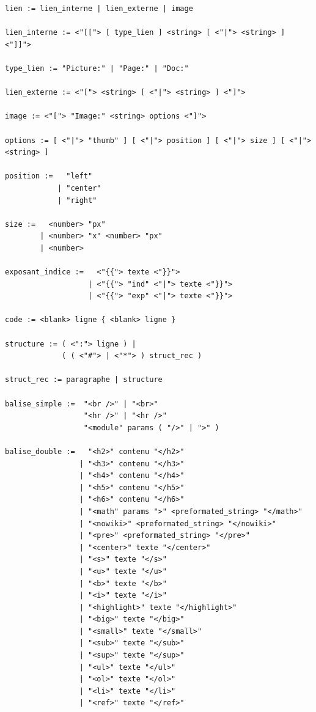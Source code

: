 \documentclass[final,11pt,a4paper,twoside,titlepage]{article}
\begin{document}
{\begin{verbatim}
lien := lien_interne | lien_externe | image
  
lien_interne := <"[["> [ type_lien ] <string> [ <"|"> <string> ] <"]]">
                                    
type_lien := "Picture:" | "Page:" | "Doc:"
  
lien_externe := <"["> <string> [ <"|"> <string> ] <"]">
  
image := <"["> "Image:" <string> options <"]">
                                 
options := [ <"|"> "thumb" ] [ <"|"> position ] [ <"|"> size ] [ <"|"> <string> ]
 
position :=   "left" 
            | "center" 
            | "right"
  
size :=   <number> "px" 
        | <number> "x" <number> "px"
        | <number>
          
exposant_indice :=   <"{{"> texte <"}}">
                   | <"{{"> "ind" <"|"> texte <"}}">
                   | <"{{"> "exp" <"|"> texte <"}}">
          
code := <blank> ligne { <blank> ligne }      
  
structure := ( <":"> ligne ) | 
             ( ( <"#"> | <"*"> ) struct_rec )
  
struct_rec := paragraphe | structure
  
balise_simple :=  "<br />" | "<br>"
                  "<hr />" | "<hr />"
                  "<module" params ( "/>" | ">" )                
  
balise_double :=   "<h2>" contenu "</h2>"
                 | "<h3>" contenu "</h3>"
                 | "<h4>" contenu "</h4>"
                 | "<h5>" contenu "</h5>"
                 | "<h6>" contenu "</h6>"
                 | "<math" params ">" <preformated_string> "</math>"
                 | "<nowiki>" <preformated_string> "</nowiki>"
                 | "<pre>" <preformated_string> "</pre>"
                 | "<center>" texte "</center>"                       
                 | "<s>" texte "</s>"
                 | "<u>" texte "</u>"
                 | "<b>" texte "</b>"
                 | "<i>" texte "</i>"
                 | "<highlight>" texte "</highlight>"
                 | "<big>" texte "</big>"
                 | "<small>" texte "</small>"
                 | "<sub>" texte "</sub>"
                 | "<sup>" texte "</sup>"
                 | "<ul>" texte "</ul>"
                 | "<ol>" texte "</ol>"
                 | "<li>" texte "</li>"
                 | "<ref>" texte "</ref>"                 


\end{verbatim}}
\end{document}
